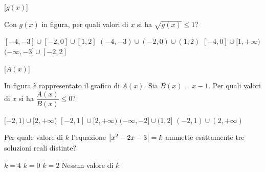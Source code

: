 \documentclass[10pt]{article}
\begin{document}
{\smallskip
\noindent
\begin{minipage}[c]{.35\linewidth}
  \centering
  \begin{ftplot}[quiz, xmin=-4.9, xmax=2.9, ymin=-1.9, ymax=2.4, ytick={-1,0,1,2},
                 minor tick num=1, legend pos=south east]
    [$g(x)$]
  \end{ftplot}
\end{minipage}\hfill
\begin{minipage}[c]{.64\linewidth}
  \begin{parts}[ragged]
    \itemx[pts=0.5, diff=2] Con $g(x)$ in figura, per quali valori di $x$ si ha $\sqrt{g(x)} \leq 1$?
      \begin{choices}[cols=1]
        \correct $[-4, -3] \cup [-2, 0] \cup [1, 2]$
        \choice $(-4, -3) \cup (-2, 0) \cup (1, 2)$
        \choice $[-4, 0] \cup [1, +\infty)$
        \choice $(-\infty, -3] \cup [-2, 2]$
      \end{choices}
  \end{parts}
\end{minipage}

\smallskip
\noindent
\begin{minipage}[c]{.35\linewidth}
  \centering
  \begin{ftplot}[quiz, xmin=-3.9, xmax=3.9, ymin=-3.9, ymax=3.9]
    [$A(x)$]
  \end{ftplot}
\end{minipage}\hfill
\begin{minipage}[c]{.64\linewidth}
  \begin{parts}[ragged]
    \itemx[pts=0.5, diff=2] In figura è rappresentato il grafico di $A(x)$. Sia $B(x) = x - 1$. Per quali valori di $x$ si ha $\dfrac{A(x)}{B(x)} \leq 0$?
      \begin{choices}
        \correct $[-2, 1) \cup [2, +\infty)$
        \choice $[-2, 1] \cup [2, +\infty)$
        \choice $(-\infty, -2] \cup (1, 2]$
        \choice $(-2, 1) \cup (2, +\infty)$
      \end{choices}
  \end{parts}
\end{minipage}

\begin{parts}
  \itemx[pts=0.5, diff=2] Per quale valore di $k$ l'equazione $\left\vert x^2 - 2x - 3 \right\vert = k$ ammette esattamente tre soluzioni reali distinte?
    \begin{choices}
      \correct $k = 4$
      \choice $k = 0$
      \choice $k = 2$
      \choice[fixed] Nessun valore di $k$
    \end{choices}
\end{parts}

}
\end{document}
